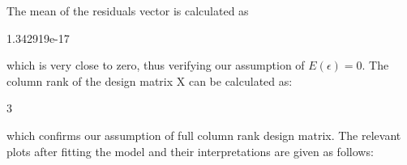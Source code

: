 \documentclass[12pt]{article}
\begin{document}
\item The mean of the residuals vector is calculated as 
\begin{Schunk}
\begin{Soutput}
[1] 1.342919e-17
\end{Soutput}
\end{Schunk}
which is very close to zero, thus verifying our assumption of $E(\epsilon)=0$. The column rank of the design matrix X can be calculated as:
\begin{Schunk}
\begin{Soutput}
[1] 3
\end{Soutput}
\end{Schunk}
which confirms our assumption of full column rank design matrix.
The relevant plots after fitting the model and their interpretations are given as follows:
\clearpage
\end{document}
